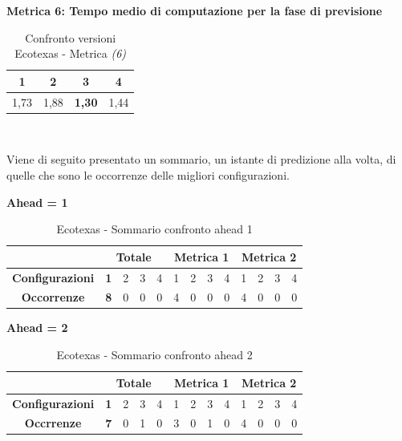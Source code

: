 \documentclass[12pt,a4paper,oneside,openright]{book}
\begin{document}
\medskip

\textbf{Metrica 6: Tempo medio di computazione per la fase di previsione}

\medskip

\begin{table}[H]
\centering
\begin{tabular}[H]{|c|c|c|c|}
\hline
1 & 2 & 3 & 4\\
\hline
1,73 & 1,88 & \textbf{1,30} & 1,44\\ 
\hline
\end{tabular} \\
\caption{Confronto versioni Ecotexas - Metrica \textit{(6)}}
\end{table}

\newpage

Viene di seguito presentato un sommario, un istante di predizione alla volta, di quelle che sono le occorrenze delle migliori configurazioni.

\medskip

\medskip
\textbf{Ahead = 1}


\begin{table}[H]
\centering
\begin{tabular}{|c|c|c|c|c|c|c|c|c|c|c|c|c|}
\hline
 & \multicolumn{4}{|c|}{\textbf{Totale}} & \multicolumn{4}{|c|}{\textbf{Metrica 1}} & \multicolumn{4}{|c|}{\textbf{Metrica 2}} \\
\hline
\textbf{Configurazioni} & \textbf{1} & 2 & 3 & 4 & 1 & 2 & 3 & 4 & 1 & 2 & 3 & 4 \\
\hline
\textbf{Occorrenze} & \textbf{8} & 0 & 0 & 0 & 4 & 0 & 0 & 0 & 4 & 0 & 0 & 0\\
\hline
\end{tabular}
\caption{Ecotexas - Sommario confronto ahead 1}
\end{table}

\medskip
\textbf{Ahead = 2}


\begin{table}[H]
\centering
\begin{tabular}{|c|c|c|c|c|c|c|c|c|c|c|c|c|}
\hline
 & \multicolumn{4}{|c|}{\textbf{Totale}} & \multicolumn{4}{|c|}{\textbf{Metrica 1}} & \multicolumn{4}{|c|}{\textbf{Metrica 2}} \\
\hline
\textbf{Configurazioni} & \textbf{1} & 2 & 3 & 4 & 1 & 2 & 3 & 4 & 1 & 2 & 3 & 4 \\
\hline
\textbf{Occrrenze} & \textbf{7} & 0 & 1 & 0 & 3 & 0 & 1 & 0 & 4 & 0 & 0 & 0 \\
\hline
\end{tabular}
\caption{Ecotexas - Sommario confronto ahead 2}
\end{table}
\end{document}
